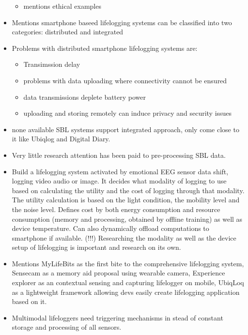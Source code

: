 \begin{itemize}
\begin{itemize}
\begin{itemize}
		\end{itemize}
	\item \cite{gurrin2014lifelogging} mentions ethical examples
	\end{itemize}
	\item \cite{ali2019insight} Mentions smartphone baseed lifelogging systems can be classified into two categories: distributed and integrated
	\item \cite{ali2019insight} Problems with distributed smartphone lifelogging systems are:
	\begin{itemize}
		\item Transimssion delay
		\item problems with data uploading where connectivity cannot be ensured
		\item data transmissions deplete battery power
		\item uploading and storing remotely can induce privacy and security issues
	\end{itemize}
	\item \cite{ali2019insight} none available SBL systems support integrated approach, only come close to it like Ubiqlog and Digital Diary.
	\item \cite{ali2019insight} Very little research attention has been paid to pre-processing SBL data.
	\item \cite{jiang2019memento} Build a lifelogging system activated by emotional EEG sensor data shift, logging video audio or image. It decides what modality of logging to use based on calculating the utility and the cost of logging through that modality. The utility calculation is based on the light condition, the mobility level and the noise level. Defines cost by both energy consumption and resource consumption (memory and processing, obtained by offline training) as well as device temperature. Can also dynamically offload computations to smartphone if available. (!!!) Researching the modality as well as the device setup of lifelogging is important and research on its own.
	\item \cite{jiang2019memento} Mentions MyLifeBits as the first bite to the comprehensive lifelogging system, Sensecam as a memory aid proposal using wearable camera, Experience explorer as an contextual sensing and capturing lifelogger on mobile, UbiqLoq as a lightweight framework allowing devs easily create lifelogging application based on it.
	\item \cite{jiang2019memento} Multimodal lifeloggers need triggering mechanisms in stead of constant storage and processing of all sensors.

\end{itemize}
